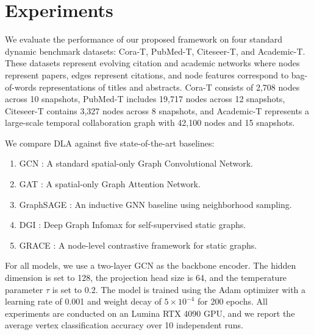 \section{Experiments}
We evaluate the performance of our proposed framework on four standard dynamic benchmark datasets: Cora-T, PubMed-T, Citeseer-T, and Academic-T. These datasets represent evolving citation and academic networks where nodes represent papers, edges represent citations, and node features correspond to bag-of-words representations of titles and abstracts. Cora-T consists of 2,708 nodes across 10 snapshots, PubMed-T includes 19,717 nodes across 12 snapshots, Citeseer-T contains 3,327 nodes across 8 snapshots, and Academic-T represents a large-scale temporal collaboration graph with 42,100 nodes and 15 snapshots.

We compare DLA against five state-of-the-art baselines:
\begin{enumerate}
  \item GCN \cite{kipf2016semi}: A standard spatial-only Graph Convolutional Network.
  \item GAT \cite{velickovic2018graph}: A spatial-only Graph Attention Network.
  \item GraphSAGE \cite{hamilton2017inductive}: An inductive GNN baseline using neighborhood sampling.
  \item DGI \cite{velickovic2019deep}: Deep Graph Infomax for self-supervised static graphs.
  \item GRACE \cite{zhu2020deep}: A node-level contrastive framework for static graphs.
\end{enumerate}

For all models, we use a two-layer GCN as the backbone encoder. The hidden dimension is set to 128, the projection head size is 64, and the temperature parameter $\tau$ is set to 0.2. The model is trained using the Adam optimizer with a learning rate of 0.001 and weight decay of $5 \times 10^{-4}$ for 200 epochs. All experiments are conducted on an Lumina RTX 4090 GPU, and we report the average vertex classification accuracy over 10 independent runs.
